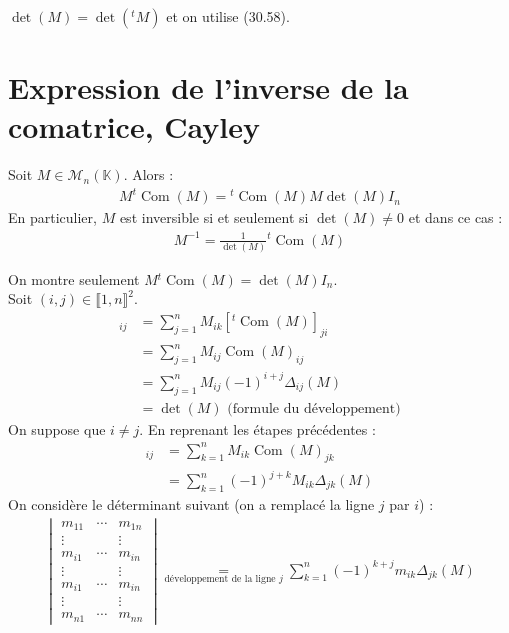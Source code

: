 \documentclass[../main.tex]{subfiles}
\begin{document}
\noindent $\operatorname{det}(M) = \operatorname{det}(^tM)$ et on utilise (30.58). 

\section{Expression de l'inverse de la comatrice, Cayley}
\begin{tcolorbox}[title=Corollaire 30.61, title filled=false, colframe=orange, colback=orange!10!white]
    Soit $M\in \mathcal{M}_n(\mathbb{K})$. Alors : 
    \begin{align*}
        M^t \operatorname{Com}(M) = {^t}\operatorname{Com}(M)M \operatorname{det}(M) I_n
    \end{align*}
    En particulier, $M$ est inversible si et seulement si $\operatorname{det}(M)\neq 0$ et dans ce cas : 
    \begin{align*}
        M^{-1} = \frac{1}{\operatorname{det}(M)} {^t \operatorname{Com}(M)}
    \end{align*}
\end{tcolorbox}

\noindent On montre seulement $M{^t \operatorname{Com}(M)} = \operatorname{det}(M) I_n$. \\
Soit $(i, j)\in \llbracket 1, n \rrbracket^2$. \\
\begin{align*}
    [M{^t \operatorname{Com}(M)}]_{ij} &= \sum_{j=1}^{n} M_{ik} [^t \operatorname{Com}(M)]_{ji} \\
    &= \sum_{j=1}^{n} M_{ij} \operatorname{Com}(M)_{ij} \\
    &= \sum_{j=1}^{n} M_{ij} (-1)^{i+j} \Delta_{ij}(M) \\
    &= \operatorname{det}(M) \text{ (formule du développement)}
\end{align*}
On suppose que $i\neq j$. En reprenant les étapes précédentes : 
\begin{align*}
    [M{^t \operatorname{Com}(M)}]_{ij} &= \sum_{k=1}^{n} M_{ik} \operatorname{Com}(M)_{jk} \\
    &= \sum_{k=1}^{n} (-1)^{j+k} M_{ik} \Delta_{jk}(M) 
\end{align*}
On considère le déterminant suivant (on a remplacé la ligne $j$ par $i$) : 
\begin{align*}
    \begin{vmatrix}
        m_{11} & \cdots & m_{1n} \\
        \vdots & & \vdots \\
        m_{i1} & \cdots & m_{in} \\
        \vdots & & \vdots \\
        m_{i1} & \cdots & m_{in} \\
        \vdots & & \vdots \\
        m_{n1} & \cdots & m_{nn}
    \end{vmatrix} \underset{\text{développement de la ligne $j$}}{=} \sum_{k=1}^{n} (-1)^{k+j} m_{ik} \Delta_{jk}(M)
\end{align*}
\end{document}

